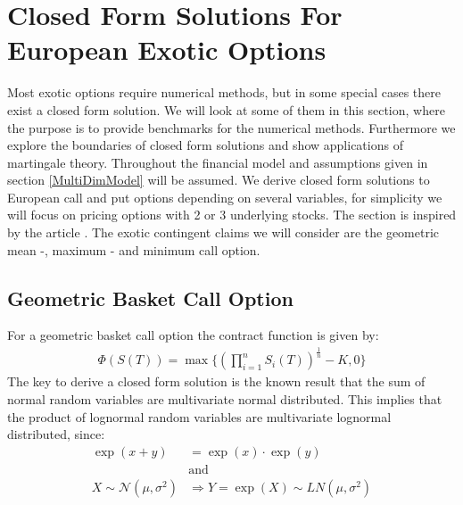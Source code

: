 \section{Closed Form Solutions For European Exotic Options}\label{ExoticEuro}
Most exotic options require numerical methods, but in some special cases there exist a closed form solution. We will look at some of them in this section, where the purpose is to provide benchmarks for the numerical methods. Furthermore we explore the boundaries of closed form solutions and show applications of martingale theory. Throughout the financial model and assumptions given in section \ref{MultiDimModel} will be assumed. We derive closed form solutions to European call and put options depending on several variables, for simplicity we will focus on pricing options with 2 or 3 underlying stocks. The section is inspired by the article \parencite{Ouwehand2006}. The exotic contingent claims we will consider are the geometric mean -, maximum - and minimum call option.

\subsection{Geometric Basket Call Option}\label{GeoBasket}
For a geometric basket call option the contract function is given by:
\begin{align*}
\Phi(S(T))=\max\{ (\prod_{i=1}^{n} S_i(T))^{\frac{1}{n}}-K,0 \}
\end{align*}
The key to  derive a closed form solution is the known result that the sum of normal random variables are multivariate normal distributed.
This implies that the product of lognormal random variables are multivariate lognormal distributed, since: 
\begin{equation*}
\begin{split}
\exp(x+y)&=\exp(x)\cdot \exp(y) \\
& \text{and}\\
 X \sim \mathcal{N}(\mu,\sigma^2) & \Rightarrow Y = \exp(X)\sim LN(\mu, \sigma^2)
\end{split}
\end{equation*}

